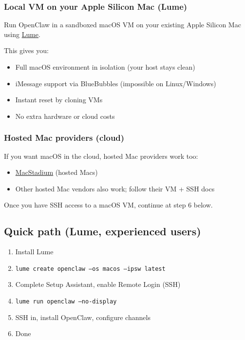 \subsubsection{Local VM on your Apple Silicon Mac (Lume)}


Run OpenClaw in a sandboxed macOS VM on your existing Apple Silicon Mac using \href{https://cua.ai/docs/lume}{Lume}.

This gives you:

\begin{itemize}
  \item Full macOS environment in isolation (your host stays clean)
  \item iMessage support via BlueBubbles (impossible on Linux/Windows)
  \item Instant reset by cloning VMs
  \item No extra hardware or cloud costs
\end{itemize}


\subsubsection{Hosted Mac providers (cloud)}


If you want macOS in the cloud, hosted Mac providers work too:

\begin{itemize}
  \item \href{https://www.macstadium.com/}{MacStadium} (hosted Macs)
  \item Other hosted Mac vendors also work; follow their VM + SSH docs
\end{itemize}


Once you have SSH access to a macOS VM, continue at step 6 below.

\hrulefill


\subsection{Quick path (Lume, experienced users)}


\begin{enumerate}
  \item Install Lume
  \item \texttt{lume create openclaw --os macos --ipsw latest}
  \item Complete Setup Assistant, enable Remote Login (SSH)
  \item \texttt{lume run openclaw --no-display}
  \item SSH in, install OpenClaw, configure channels
  \item Done
\end{enumerate}



